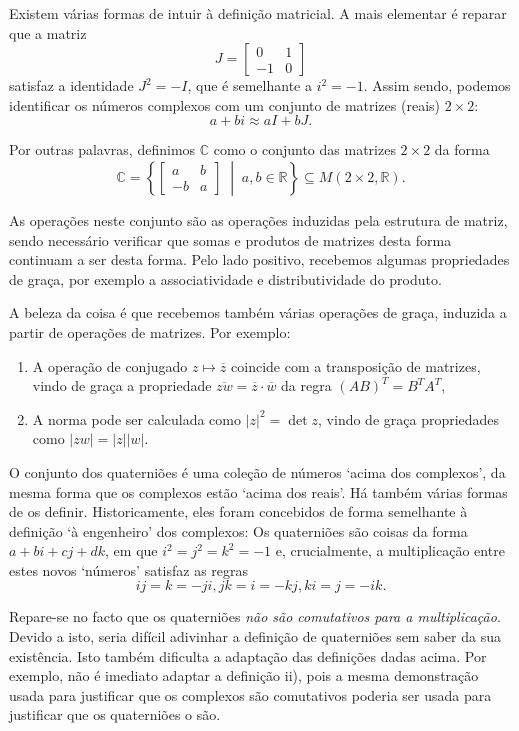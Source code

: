 \documentclass{article}
\newcommand{\R}{\mathbb{R}}
\newcommand{\C}{\mathbb{C}}
\begin{document}
Existem várias formas de intuir à definição matricial. A mais elementar é reparar que a matriz
\[J = \begin{bmatrix} 0 & 1 \\ -1 & 0 \end{bmatrix}\]
satisfaz a identidade $J^2 = -I$, que é semelhante a $i^2 = -1$. Assim sendo, podemos identificar os números complexos com um conjunto de matrizes (reais) $2 \times 2$:
\[a + bi \approx a I + b J.\]

Por outras palavras, definimos $\C$ como o conjunto das matrizes $2 \times 2$ da forma
\[\C = \left\{ \begin{bmatrix} a & b \\ -b & a \end{bmatrix} \;\middle|\; a, b \in \R \right\} \subseteq M(2 \times 2, \R).\]

As operações neste conjunto são as operações induzidas pela estrutura de matriz, sendo necessário verificar que somas e produtos de matrizes desta forma continuam a ser desta forma. Pelo lado positivo, recebemos algumas propriedades de graça, por exemplo a associatividade e distributividade do produto.

A beleza da coisa é que recebemos também várias operações de graça, induzida a partir de operações de matrizes. Por exemplo:
\begin{enumerate}
\item A operação de conjugado $z \mapsto \overline{z}$ coincide com a transposição de matrizes, vindo de graça a propriedade $\overline{zw} = \overline{z} \cdot \overline{w}$ da regra $(AB)^T = B^T A^T$,
\item A norma pode ser calculada como $\lvert z \rvert^2 = \det z$, vindo de graça propriedades como $\lvert z w \rvert = \lvert z \rvert \lvert w \rvert$.
\end{enumerate}

\medskip

O conjunto dos quaterniões é uma coleção de números `acima dos complexos', da mesma forma que os complexos estão `acima dos reais'. Há também várias formas de os definir. Historicamente, eles foram concebidos de forma semelhante à definição `à engenheiro' dos complexos: Os quaterniões são coisas da forma $a+bi+cj+dk$, em que $i^2 = j^2 = k^2 = -1$ e, crucialmente, a multiplicação entre estes novos `números' satisfaz as regras
\[ ij = k = -ji , jk = i = -kj, ki = j = -ik.\]

Repare-se no facto que os quaterniões \emph{não são comutativos para a multiplicação}. Devido a isto, seria difícil adivinhar a definição de quaterniões sem saber da sua existência. Isto também dificulta a adaptação das definições dadas acima. Por exemplo, não é imediato adaptar a definição ii), pois a mesma demonstração usada para justificar que os complexos são comutativos poderia ser usada para justificar que os quaterniões o são.
\end{document}
